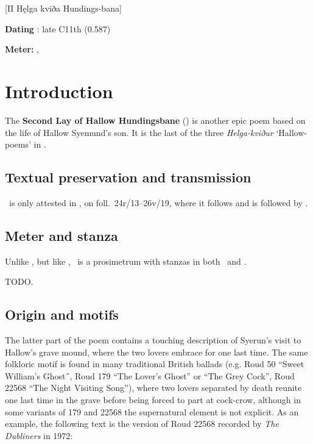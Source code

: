 [II Hęlga kviða Hundings-bana]

\begin{flushright}%
\textbf{Dating} \parencite{Sapp2022}: late C11th (0.587)

\textbf{Meter:} \Fornyrdislag, \Ljodahattr%
\end{flushright}

\section{Introduction}

The \textbf{Second Lay of Hallow Hundingsbane} (\HelgakvidaTwo) is another epic poem based on the life of Hallow Syemund’s son.  It is the last of the three \emph{Helga-kviður} ‘Hallow-poems’ in \Regius.

\subsection{Textual preservation and transmission}

\HelgakvidaTwo\ is only attested in \Regius, on foll.~24r/13--26v/19, where it follows  and is followed by .

\subsection{Meter and stanza}

Unlike , but like , \HelgakvidaTwo\ is a prosimetrum with stanzas in both \Fornyrdislag\ and \Ljodahattr.

TODO.

\subsection{Origin and motifs}

The latter part of the poem contains a touching description of Syerun’s visit to Hallow’s grave mound, where the two lovers embrace for one last time.  The same folkloric motif is found in many traditional British ballads (e.g. Roud 50 “Sweet William’s Ghost˝, Roud 179 “The Lover’s Ghost” or “The Grey Cock”, Roud 22568 “The Night Visiting Song”), where two lovers separated by death reunite one last time in the grave before being forced to part at cock-crow, although in some variants of 179 and 22568 the supernatural element is not explicit.  As an example, the following text is the version of Roud 22568 recorded by \emph{The Dubliners} in 1972:

